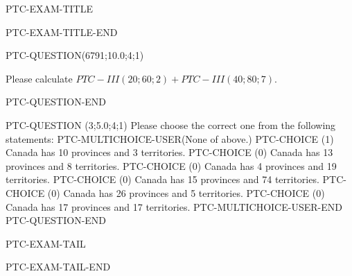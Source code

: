 \documentclass[12pt]{article}
\begin{document}
PTC-EXAM-TITLE




PTC-EXAM-TITLE-END



PTC-QUESTION(6791;10.0;4;1)

Please calculate $PTC-III (20; 60; 2) + PTC-III (40; 80; 7) $. 


PTC-QUESTION-END



PTC-QUESTION  (3;5.0;4;1)
Please choose the correct one from the following statements:
PTC-MULTICHOICE-USER(None of above.)
   PTC-CHOICE (1) Canada has 10  provinces and 3 territories.
   PTC-CHOICE (0) Canada has  13 provinces and  8 territories.
   PTC-CHOICE (0) Canada has   4 provinces and  19 territories.
   PTC-CHOICE (0) Canada has  15 provinces and  74 territories.
   PTC-CHOICE (0) Canada has  26 provinces and  5 territories.
   PTC-CHOICE (0) Canada has  17 provinces and  17 territories.
PTC-MULTICHOICE-USER-END
PTC-QUESTION-END



PTC-EXAM-TAIL

PTC-EXAM-TAIL-END
\end{document}
